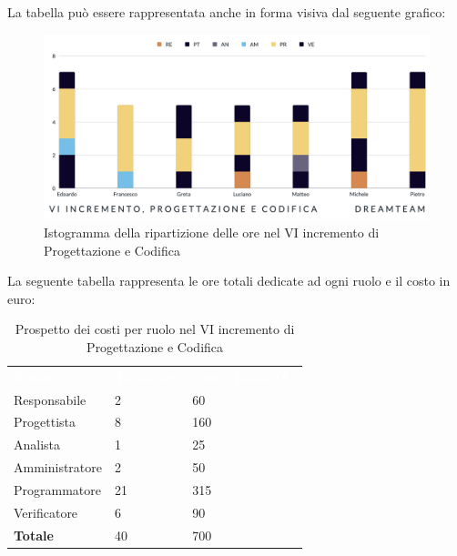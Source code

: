 La tabella può essere rappresentata anche in forma visiva dal seguente grafico:
\begin{figure}[H]
\centering
\includegraphics[scale=0.55]{Sezioni/SezioniPreventivo/grafici/Preventivo_progettazione_VI.png}
\caption{Istogramma della ripartizione delle ore nel VI incremento di Progettazione e Codifica}
\end{figure}

La seguente tabella rappresenta le ore totali dedicate ad ogni ruolo e il costo in euro:

\begin{table}[H]
\begin{center}
\renewcommand{\arraystretch}{1.5}
\begin{tabular}{ m{}<{\centering}  m{}<{\centering} m{}<{\centering}}
	\rowcolor{darkblue}
	\textcolor{white}{\textbf{Ruolo}}&\textcolor{white}{\textbf{Totale ore}}&\textcolor{white}{\textbf{Costo totale (\euro)}}\\ 

	Responsabile  & 2 & 60 \\	
	
	Progettista & 8 & 160 \\
	
	Analista & 1 & 25 \\

	Amministratore & 2 & 50 \\
	
	Programmatore & 21 & 315 \\
	
	Verificatore & 6 & 90 \\
	
	\textbf{Totale} & 40 & 700 \\
	
\end{tabular}
\caption{Prospetto dei costi per ruolo nel VI incremento di Progettazione e Codifica}
\end{center}
\end{table}

